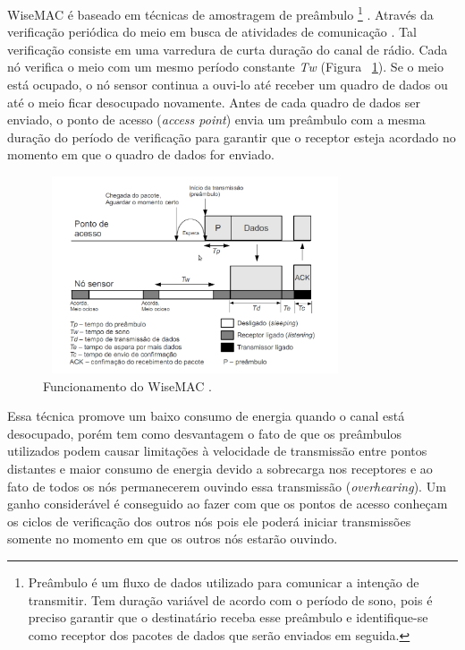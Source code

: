  WiseMAC é baseado em técnicas de amostragem de preâmbulo%
 \footnote{Preâmbulo é um fluxo de dados utilizado para comunicar a intenção de transmitir. Tem duração variável de acordo com o período de sono, pois é preciso garantir que o destinatário receba esse preâmbulo e identifique-se como receptor dos pacotes de dados que serão enviados em seguida.} 
. Através da verificação periódica do meio em busca de atividades de comunicação \cite{El-Hoiydi2004}. Tal verificação consiste em uma varredura de curta duração do canal de rádio. Cada nó verifica o meio com um mesmo período constante \textit{Tw} (Figura ~\ref{fig:wisemac}). Se o meio está ocupado, o nó sensor continua a ouvi-lo até receber um quadro de dados ou até o meio ficar desocupado novamente. Antes de cada quadro de dados ser enviado, o ponto de acesso (\textit{access point}) envia um preâmbulo com a mesma duração do período de verificação para garantir que o receptor esteja acordado no momento em que o quadro de dados for enviado. 

\begin{figure}[!htb]
\centering
\includegraphics[width=340px,height=220px]{./Pictures/wisemac.png}
\caption{Funcionamento do WiseMAC \cite{El-Hoiydi2004}.} %
\label{fig:wisemac} %
\end{figure}

Essa técnica promove um baixo consumo de energia quando o canal está desocupado, porém tem como desvantagem o fato de que os preâmbulos utilizados podem causar limitações à velocidade de transmissão entre pontos distantes e maior consumo de energia devido a sobrecarga nos receptores e ao fato de todos os nós permanecerem ouvindo essa transmissão (\textit{overhearing}). Um ganho considerável é conseguido ao fazer com que os pontos de acesso conheçam os ciclos de verificação dos outros nós pois ele poderá iniciar transmissões somente no momento em que os outros nós estarão ouvindo.

